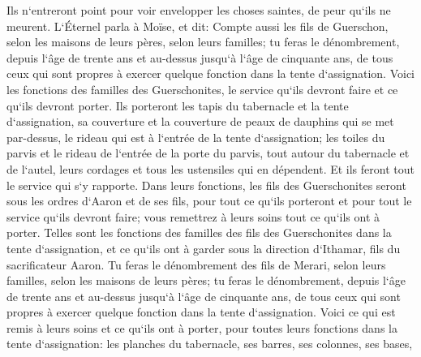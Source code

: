 \verse Ils n`entreront point pour voir envelopper les choses saintes, de peur qu`ils ne meurent. 
\verse L`Éternel parla à Moïse, et dit: 
\verse Compte aussi les fils de Guerschon, selon les maisons de leurs pères, selon leurs familles; 
\verse tu feras le dénombrement, depuis l`âge de trente ans et au-dessus jusqu`à l`âge de cinquante ans, de tous ceux qui sont propres à exercer quelque fonction dans la tente d`assignation. 
\verse Voici les fonctions des familles des Guerschonites, le service qu`ils devront faire et ce qu`ils devront porter. 
\verse Ils porteront les tapis du tabernacle et la tente d`assignation, sa couverture et la couverture de peaux de dauphins qui se met par-dessus, le rideau qui est à l`entrée de la tente d`assignation; 
\verse les toiles du parvis et le rideau de l`entrée de la porte du parvis, tout autour du tabernacle et de l`autel, leurs cordages et tous les ustensiles qui en dépendent. Et ils feront tout le service qui s`y rapporte. 
\verse Dans leurs fonctions, les fils des Guerschonites seront sous les ordres d`Aaron et de ses fils, pour tout ce qu`ils porteront et pour tout le service qu`ils devront faire; vous remettrez à leurs soins tout ce qu`ils ont à porter. 
\verse Telles sont les fonctions des familles des fils des Guerschonites dans la tente d`assignation, et ce qu`ils ont à garder sous la direction d`Ithamar, fils du sacrificateur Aaron. 
\verse Tu feras le dénombrement des fils de Merari, selon leurs familles, selon les maisons de leurs pères; 
\verse tu feras le dénombrement, depuis l`âge de trente ans et au-dessus jusqu`à l`âge de cinquante ans, de tous ceux qui sont propres à exercer quelque fonction dans la tente d`assignation. 
\verse Voici ce qui est remis à leurs soins et ce qu`ils ont à porter, pour toutes leurs fonctions dans la tente d`assignation: les planches du tabernacle, ses barres, ses colonnes, ses bases, 
